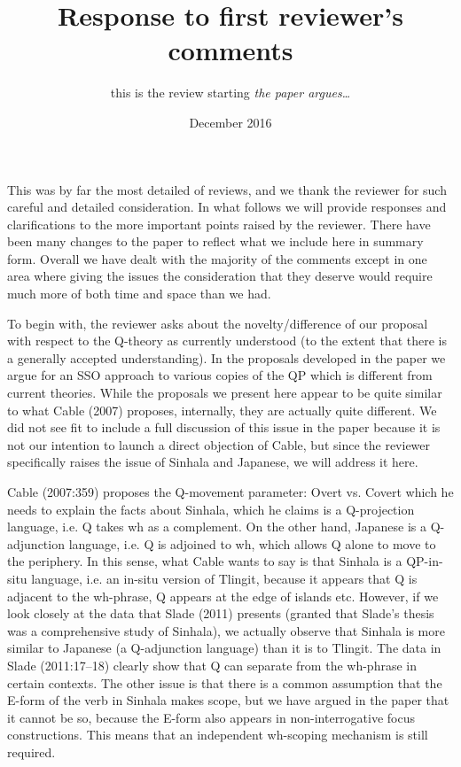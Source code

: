 \documentclass[11pt]{article}
\begin{document}
\title{Response to first reviewer's comments}
\author{this is the review starting \textit{the paper argues\ldots}}
\date{December 2016}

\maketitle
This was by far the most detailed of reviews, and we thank the reviewer for such careful and detailed consideration. In what follows we will provide responses and clarifications to the more important points raised by the reviewer.  There have been many changes to the paper to reflect what we include here in summary form.  Overall we have dealt with the majority of the comments except in one area where giving the issues the consideration that they deserve would require much more of both time and space than we had.

To begin with, the reviewer asks about the novelty/difference of our proposal with respect to the Q-theory as currently understood (to the extent that there is a generally accepted understanding).  In the proposals developed in the paper we argue for an SSO approach to various copies of the QP which is different from current theories. While the proposals we present here appear to be quite similar to what Cable (2007) proposes, internally, they are actually quite different. We did not see fit to include a full discussion of this issue in the paper because it is not our intention to launch a direct objection of Cable, but since the reviewer specifically raises the issue of Sinhala and Japanese, we will address it here.

Cable (2007:359) proposes the Q-movement parameter: Overt vs. Covert which he needs to explain the facts about Sinhala, which he claims is a Q-projection language, i.e. Q takes wh as a complement. On the other hand, Japanese is a Q-adjunction language, i.e. Q is adjoined to wh, which allows Q alone to move to the periphery. In this sense, what Cable wants to say is that Sinhala is a QP-in-situ language, i.e. an in-situ version of Tlingit, because it appears that Q is adjacent to the wh-phrase, Q appears at the edge of islands etc. However, if we look closely at the data that Slade (2011) presents (granted that Slade's thesis was a comprehensive study of Sinhala), we actually observe that Sinhala is more similar to Japanese (a Q-adjunction language) than it is to Tlingit. The data in Slade (2011:17--18) clearly show that Q can separate from the wh-phrase in certain contexts. The other issue is that there is a common assumption that the E-form of the verb in Sinhala makes scope, but we have argued in the paper that it cannot be so, because the E-form also appears in non-interrogative focus constructions. This means that an independent wh-scoping mechanism is still required.
\end{document}
